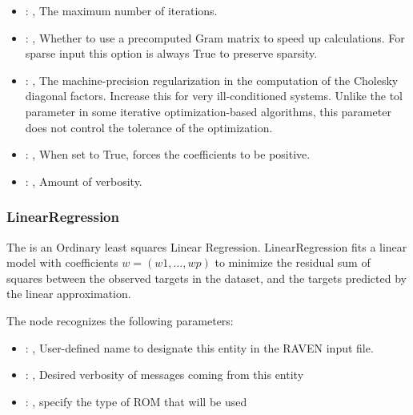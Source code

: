 \begin{itemize}
    \item {}: , 
      The maximum number of iterations.

    \item {}: , 
      Whether to use a precomputed Gram matrix to speed up calculations.
      For sparse input this option is always True to preserve sparsity.

    \item {}: , 
      The machine-precision regularization in the computation of the Cholesky
      diagonal factors. Increase this for very ill-conditioned systems. Unlike the tol
      parameter in some iterative optimization-based algorithms, this parameter does not
      control the tolerance of the optimization.

    \item {}: , 
      When set to True, forces the coefficients to be positive.

    \item {}: , 
      Amount of verbosity.
  \end{itemize}


\subsubsection{LinearRegression}
  The                          is an Ordinary least squares Linear
  Regression.                         LinearRegression fits a linear model with coefficients $w =
  (w1, …, wp)$ to                         minimize the residual sum of squares between the observed
  targets in the                         dataset, and the targets predicted by the linear
  approximation.                         

  The  node recognizes the following parameters:
    \begin{itemize}
      \item {}: , 
        User-defined name to designate this entity in the RAVEN input file.
      \item {}: , 
        Desired verbosity of messages coming from this entity
      \item {}: , 
        specify the type of ROM that will be used
  \end{itemize}

